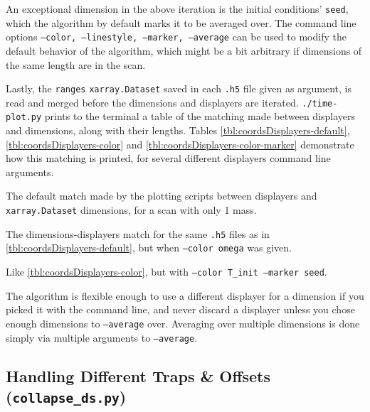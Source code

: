An exceptional dimension in the above iteration is the initial conditions' \texttt{seed}, which the algorithm by default marks it to be averaged over. The command line options \texttt{--color, --linestyle, --marker, --average} can be used to modify the default behavior of the algorithm, which might be a bit arbitrary if dimensions of the same length are in the scan.

Lastly, the \texttt{ranges} \texttt{xarray.Dataset} saved in each \texttt{.h5} file given as argument, is read and merged before the dimensions and displayers are iterated. \texttt{./time-plot.py} prints to the terminal a table of the matching made between displayers and dimensions, along with their lengths. Tables \ref{tbl:coordsDisplayers-default}, \ref{tbl:coordsDisplayers-color} and \ref{tbl:coordsDisplayers-color-marker} demonstrate how this matching is printed, for several different displayers command line arguments.

\begin{table}[h]

\caption{The default match made by the plotting scripts between displayers and \texttt{xarray.Dataset} dimensions, for a scan with only 1 mass.}
\label{tbl:coordsDisplayers-default}
\end{table}

\begin{table}[h]

\caption{The dimensions-displayers match for the same \texttt{.h5} files as in \ref{tbl:coordsDisplayers-default}, but when \texttt{--color omega} was given.}
\label{tbl:coordsDisplayers-color}
\end{table}

\begin{table}[h]

\caption{Like \ref{tbl:coordsDisplayers-color}, but with \texttt{--color T\_init --marker seed}.}
\label{tbl:coordsDisplayers-color-marker}
\end{table}

The algorithm is flexible enough to use a different displayer for a dimension if you picked it with the command line, and never discard a displayer unless you chose enough dimensions to \texttt{--average} over. Averaging over multiple dimensions is done simply via multiple arguments to \texttt{--average}.

\subsection{Handling Different Traps \& Offsets (\texttt{collapse\_ds.py})}

